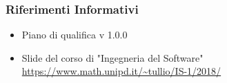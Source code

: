 		\subsubsection{Riferimenti Informativi}
			\begin{itemize}
			\item Piano di qualifica v 1.0.0
			\item Slide del corso di "Ingegneria del Software"\newline
			\url{https://www.math.unipd.it/~tullio/IS-1/2018/}
		\end{itemize}
				

\newpage
